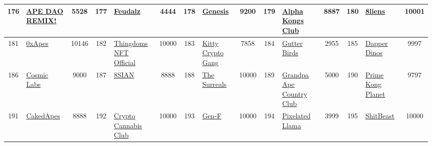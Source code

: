 \begin{table*}[]
{\begin{tabular}{|c|l|c|c|l|c|c|l|c|c|l|c|c|l|c|}
        176   & \href{http://remixclub.io}{APE DAO REMIX!}                                         & 5528              & 177   & \href{https://feudalz.io}{Feudalz}                                                                & 4444              & 178   & \href{http://tgoagenesis.com}{Genesis}                                            & 9200              & 179   & \href{https://www.alphakongsclub.com/}{Alpha Kongs Club}                      & 8887              & 180   & \href{http://8liens.xyz}{8liens}                                                          & 10001                                   \\ \hline
        181   & \href{https://www.0xapes.com/}{0xApes}                                             & 10146             & 182   & \href{http://thingdoms.io}{Thingdoms NFT Official}                                                & 10000             & 183   & \href{https://KittyCryptoGang.com}{Kitty Crypto Gang}                             & 7858              & 184   & \href{https://guttercatgang.com/}{Gutter Birds}                               & 2955              & 185   & \href{http://dapperdinos.com}{Dapper Dinos}                                               & 9997                                    \\ \hline
        186   & \href{https://cosmic-labs.io/\#/}{Cosmic Labs}                                     & 9000              & 187   & \href{http://8sian.io}{8SIAN}                                                                     & 8888              & 188   & \href{https://surreals.io}{The Surreals}                                          & 10000             & 189   & \href{http://www.grandpaapecountryclub.com}{Grandpa Ape Country Club}         & 5000              & 190   & \href{https://primeplanet.io}{Prime Kong Planet}                                          & 9797                                    \\ \hline
        191   & \href{https://www.cakedworld.com}{CakedApes}                                       & 8888              & 192   & \href{https://cryptocannabisclub.com}{Crypto Cannabis Club}                                       & 10000             & 193   & \href{https://flooz.world}{Gen-F}                                                 & 10000             & 194   & \href{http://llamaverse.io}{Pixelated Llama}                                  & 3999              & 195   & \href{https://pieceofshit.wtf/}{ShitBeast}                                                & 10000                                   \\ \hline

\end{tabular}}
\end{table*}
